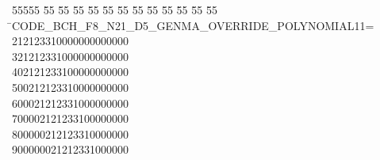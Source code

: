 %
%
\begin{tabbing}
55555 \= 55 \= 55 \= 55 \= 55 \= 55 \= 55 \= 55 \= 55 \= 55 \= 55 \= 55 \= 55 \= \>CODE\_BCH\_F8\_N21\_D5\_GENMA\_OVERRIDE\_POLYNOMIAL11=\\[0pt]
212123310000000000000\\[0pt]
321212331000000000000\\[0pt]
402121233100000000000\\[0pt]
500212123310000000000\\[0pt]
600021212331000000000\\[0pt]
700002121233100000000\\[0pt]
800000212123310000000\\[0pt]
900000021212331000000\\[0pt]

\end{tabbing}
